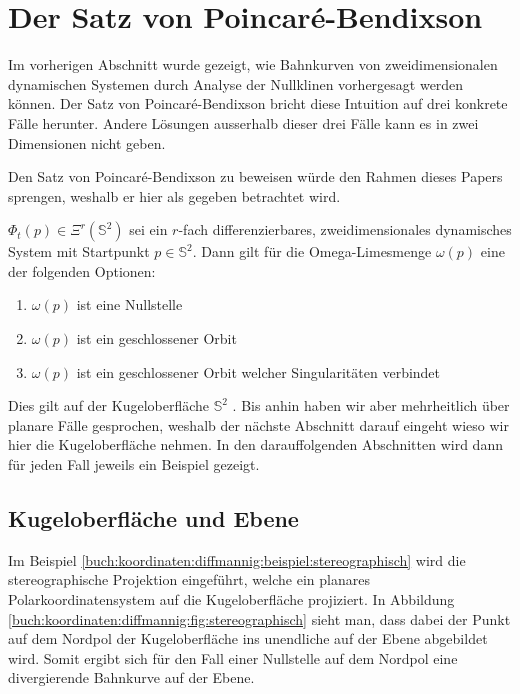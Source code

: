 \section{Der Satz von Poincaré-Bendixson} \label{poinbendix:section:poinbendix}

Im vorherigen Abschnitt wurde gezeigt, wie Bahnkurven von zweidimensionalen dynamischen Systemen durch Analyse der Nullklinen vorhergesagt werden können.
Der Satz von Poincaré-Bendixson bricht diese Intuition auf drei konkrete Fälle herunter.
Andere Lösungen ausserhalb dieser drei Fälle kann es in zwei Dimensionen nicht geben.

Den Satz von Poincaré-Bendixson zu beweisen würde den Rahmen dieses Papers sprengen, weshalb er hier als gegeben betrachtet wird.


\begin{satz}
\label{poinbendix:satz:poinbendix}
$\Phi_t(p) \in \Xi^r(\mathbb{S}^2)$ sei ein $r$-fach differenzierbares, zweidimensionales dynamisches System mit Startpunkt $p \in \mathbb{S}^2$.
Dann gilt für die Omega-Limesmenge $\omega(p)$ eine der folgenden Optionen:
\begin{enumerate}
\item $\omega(p)$ ist eine Nullstelle
\item $\omega(p)$ ist ein geschlossener Orbit
\item $\omega(p)$ ist ein geschlossener Orbit welcher Singularitäten verbindet
\end{enumerate}
\end{satz}

Dies gilt auf der Kugeloberfläche $\mathbb{S}^2$ \cite{poinbendix:melo}.
Bis anhin haben wir aber mehrheitlich über planare Fälle gesprochen, weshalb der nächste Abschnitt darauf eingeht wieso wir hier die Kugeloberfläche nehmen.
In den darauffolgenden Abschnitten wird dann für jeden Fall jeweils ein Beispiel gezeigt.

\subsection{Kugeloberfläche und Ebene} \label{poinbendix:subsection:kugeloberflaeche}

Im Beispiel \ref{buch:koordinaten:diffmannig:beispiel:stereographisch} wird die stereographische Projektion eingeführt, welche ein planares Polarkoordinatensystem auf die Kugeloberfläche projiziert.
In Abbildung \ref{buch:koordinaten:diffmannig:fig:stereographisch} sieht man, dass dabei der Punkt auf dem Nordpol der Kugeloberfläche ins unendliche auf der Ebene abgebildet wird.
Somit ergibt sich für den Fall einer Nullstelle auf dem Nordpol eine divergierende Bahnkurve auf der Ebene.

